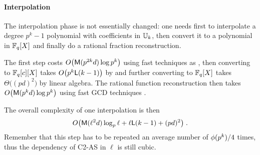 \paragraph{Interpolation}
The interpolation phase is not essentially changed: one needs first to
interpolate a degree $p^k-1$ polynomial with coefficients in $\mathbb{U}_k$,
then convert it to a polynomial in $\mathbb{F}_q[X]$ and finally do a rational
fraction reconstruction.

The first step costs $O\bigl(\mathrm{\sf M}(p^{2k}d)\log p^k\bigr)$ using fast techniques
as \cite[$\S$10.2]{vzGG}, then converting to $\mathbb{F}_q[c][X]$ takes
$O\bigl(p^k{\sf L}(k-1)\bigr)$ by \cite{DFS09} and further converting to
$\mathbb{F}_q[X]$ takes $\Theta\bigl((pd)^2\bigr)$ by linear algebra. The rational function
reconstruction then takes $O\bigl(\mathrm{\sf M}(p^kd)\log p^k\bigr)$ using
fast GCD techniques \cite[$\S$11.1]{vzGG}.

The overall complexity of one interpolation is then
\begin{equation}
  \label{eq:C2-AS:complexity:interp}
  O\bigl(\mathrm{\sf M}(\ell^2d)\log_p\ell + \ell{\sf L}(k-1) + (pd)^2\bigr)
  \;\text{.}
\end{equation}
Remember that this step has to be repeated an average number of
$\phi(p^k)/4$ times, thus the dependency of C2-AS in $\ell$ is still cubic.



%
